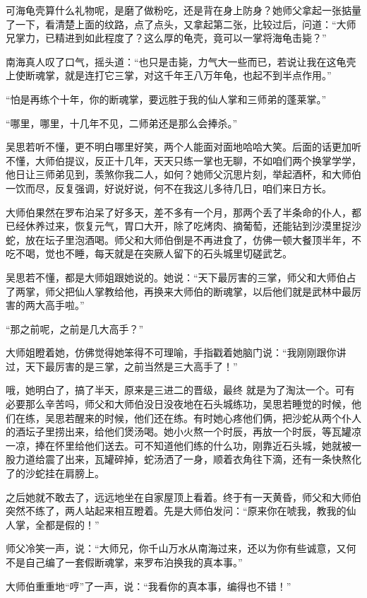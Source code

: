 可海龟壳算什么礼物呢，是磨了做粉吃，还是背在身上防身？她师父拿起一张掂量了一下，看清楚上面的纹路，点了点头，又拿起第二张，比较过后，问道：“大师兄掌力，已精进到如此程度了？这么厚的龟壳，竟可以一掌将海龟击毙？”

南海真人叹了口气，摇头道：“也只是击毙，力气大一些而已，若说让我在这龟壳上使断魂掌，就是连打它三掌，对这千年王八万年龟，也起不到半点作用。”

“怕是再练个十年，你的断魂掌，要远胜于我的仙人掌和三师弟的蓬莱掌。”

“哪里，哪里，十几年不见，二师弟还是那么会捧杀。”

吴思若听不懂，更不明白哪里好笑，两个人能面对面地哈哈大笑。后面的话更加听不懂，大师伯提议，反正十几年，天天只练一掌也无聊，不如咱们两个换掌学学，他日让三师弟见到，羡煞你我二人，如何？她师父沉思片刻，举起酒杯，和大师伯一饮而尽，反复强调，好说好说，何不在我这儿多待几日，咱们来日方长。

大师伯果然在罗布泊呆了好多天，差不多有一个月，那两个丢了半条命的仆人，都已经休养过来，恢复元气，胃口大开，除了吃烤肉、摘葡萄，还能钻到沙漠里捉沙蛇，放在坛子里泡酒喝。师父和大师伯倒是不再进食了，仿佛一顿大餐顶半年，不吃不喝，觉也不睡，每天就是在突厥人留下的石头城里切磋武艺。

吴思若不懂，都是大师姐跟她说的。她说：“天下最厉害的三掌，师父和大师伯占了两掌，师父把仙人掌教给他，再换来大师伯的断魂掌，以后他们就是武林中最厉害的两大高手啦。”

“那之前呢，之前是几大高手？”

大师姐瞪着她，仿佛觉得她笨得不可理喻，手指戳着她脑门说：“我刚刚跟你讲过，天下最厉害的是三掌，之前当然是三大高手了！”

哦，她明白了，搞了半天，原来是三进二的晋级，最终
就是为了淘汰一个。可有必要那么辛苦吗，师父和大师伯没日没夜地在石头城练功，吴思若睡觉的时候，他们在练，吴思若醒来的时候，他们还在练。有时她心疼他们俩，把沙蛇从两个仆人的酒坛子里捞出来，给他们煲汤喝。她小火熬一个时辰，再放一个时辰，等瓦罐凉一凉，捧在怀里给他们送去。可不知道他们练的什么功，刚靠近石头城，她就被一股力道给震了出来，瓦罐碎掉，蛇汤洒了一身，顺着衣角往下滴，还有一条快熬化了的沙蛇挂在肩膀上。

之后她就不敢去了，远远地坐在自家屋顶上看着。终于有一天黄昏，师父和大师伯突然不练了，两人站起来相互瞪着。先是大师伯发问：“原来你在唬我，教我的仙人掌，全都是假的！”

师父冷笑一声，说：“大师兄，你千山万水从南海过来，还以为你有些诚意，又何不是自己编了一套假断魂掌，来罗布泊换我的真本事。”

大师伯重重地“哼”了一声，说：“我看你的真本事，编得也不错！”

